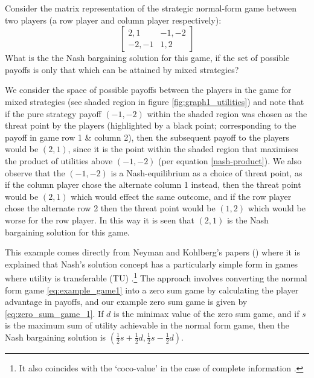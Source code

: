 \begin{example}
Consider the matrix representation of the strategic normal-form game between two players (a row player and column player respectively):
\begin{equation}\label{eq:example_game1} \begin{bmatrix}2,1 & -1,-2\\ -2,-1 & 1,2\end{bmatrix} \end{equation}
What is the the Nash bargaining solution for this game, if the set of possible payoffs is only that which can be attained by mixed strategies?\end{example}
\begin{solution}
We consider the space of possible payoffs between the players in the game for mixed strategies (see shaded region in figure \ref{fig:graph1_utilities})
and note that if the pure strategy payoff $(-1,-2)$ within the shaded region was chosen as the threat point by the players (highlighted by a black point; corresponding to the payoff in game row 1 \& column 2), then the subsequent payoff to the players would be $(2,1)$, since it is the point within the shaded region that maximises the product of utilities above $(-1,-2)$ (per equation \ref{nash-product}).
We also observe that the $(-1,-2)$ is a Nash-equilibrium as a choice of threat point, as if the column player chose the alternate column 1 instead, then the threat point would be $(2,1)$ which would effect the same outcome, and if the row player chose the alternate row 2 then the threat point would be $(1,2)$ which would be worse for the row player.
In this way it is seen that $(2,1)$ is the Nash bargaining solution for this game.
\end{solution}
\vspace{2mm}

This example comes directly from Neyman and Kohlberg's papers (\cite{value2,value1}) where it is explained that Nash's solution concept has a particularly simple form in games where utility is transferable (TU) \cite{value2,shap_lectures,value1}.\footnote{It also coincides with the `coco-value' in the case of complete information \cite{kalai1,Kalai2010}.}
The approach involves converting the normal form game \eqref{eq:example_game1} into a zero sum game by calculating the player advantage in payoffs, and our example zero sum game is given by \eqref{eq:zero_sum_game_1}.
If $d$ is the minimax value of the zero sum game, and if $s$ is the maximum sum of utility achievable in the normal form game, then the Nash bargaining solution is $(\frac{1}{2}s+\frac{1}{2}d,\frac{1}{2}s-\frac{1}{2}d)$.

